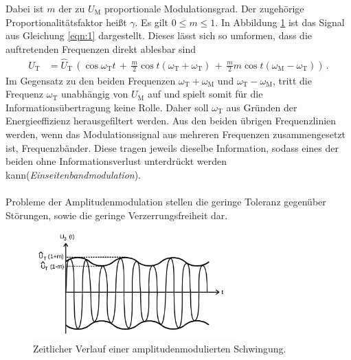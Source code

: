 Dabei ist $m$ der zu $U_{\text{M}}$ proportionale Modulationsgrad.
Der zugehörige Proportionalitätsfaktor heißt $\gamma$.
Es gilt $0 \leq m \leq 1$.
In Abbildung \ref{fig:amplitudenmodulation_1} ist das Signal aus Gleichung
\eqref{eqn:1} dargestellt.
Dieses lässt sich so umformen, dass die auftretenden Frequenzen direkt
ablesbar sind
\begin{align}
\label{eqn:2}
U_{\text{T}} &= \hat{U}_{\text{T}} \, \left( \cos \omega_{\text{T}} t \, + \, \frac{m}{2} \cos t\left( \omega_{\text{T}} + \omega_{\text{T}} \right) \, + \, \frac{m}{2} m \cos t \left( \omega_{\text{M}} - \omega_{\text{T}} \right)\right) \, .
\end{align}
Im Gegensatz zu den beiden Frequenzen $\omega_{\text{T}} + \omega_{\text{M}}$ und $\omega_{\text{T}} - \omega_{\text{M}}$, tritt die Frequenz $\omega_{\text{T}}$
unabhängig von $U_{\text{M}}$ auf und spielt somit
für die Informationsübertragung keine Rolle. Daher soll $\omega_{\text{T}}$
aus Gründen der Energieeffizienz herausgefiltert werden.
Aus den beiden übrigen Frequenzlinien werden, wenn das Modulationssignal
aus mehreren Frequenzen zusammengesetzt ist, Frequenzbänder.
Diese tragen jeweils dieselbe Information, sodass eines der beiden ohne
Informationsverlust unterdrückt werden kann(\textit{Einseitenbandmodulation}).\\ \\

Probleme der Amplitudenmodulation stellen die geringe Toleranz gegenüber
Störungen, sowie die geringe Verzerrungsfreiheit dar.

\begin{figure}
\centering
\includegraphics[width=0.7\textwidth]{figures/amplitudenmodulation.PNG}
\caption{Zeitlicher Verlauf einer amplitudenmodulierten Schwingung.\cite{sample}}
\label{fig:amplitudenmodulation_1}
\end{figure}

